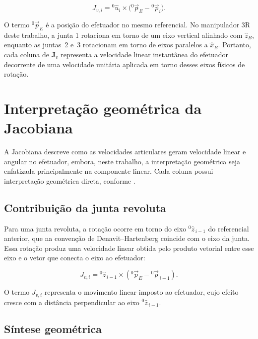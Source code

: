 \begin{equation}
J_{v,i}
=
{}^{0}\!\hat{u}_{i}
\times
\bigl(
{}^{0}\!\vec p_{E}
-
{}^{0}\!\vec p_{i}
\bigr).
\end{equation}

O termo ${}^{0}\!\vec p_{E}$ é a posição do efetuador no mesmo referencial.
No manipulador 3R deste trabalho, a junta 1 rotaciona em torno de um eixo vertical alinhado com $\hat{z}_{B}$, enquanto as juntas~2 e~3 rotacionam em torno de eixos paralelos a $\hat{x}_{B}$. 
Portanto, cada coluna de $\mathbf{J}_{v}$ representa a velocidade linear instantânea do efetuador decorrente de uma velocidade unitária aplicada em torno desses eixos físicos de rotação.

\section{Interpretação geométrica da Jacobiana}
\label{sec_interpretacao_geometrica_jacobiana}

A Jacobiana descreve como as velocidades articulares geram velocidade linear e angular no efetuador, embora, neste trabalho, a interpretação geométrica seja enfatizada principalmente na componente linear.
Cada coluna possui interpretação geométrica direta, conforme \cite{craig2005}.

\subsection{Contribuição da junta revoluta}

Para uma junta revoluta, a rotação ocorre em torno do eixo ${}^{0}\!\hat{z}_{\,i-1}$ do referencial anterior, que na convenção de Denavit--Hartenberg coincide com o eixo da junta.
Essa rotação produz uma velocidade linear obtida pelo produto vetorial entre esse eixo e o vetor que conecta o eixo ao efetuador:

\begin{equation}
J_{v,i}
=
{}^{0}\!\hat{z}_{\,i-1}
\times
\left(
{}^{0}\!\vec{p}_{E}
-
{}^{0}\!\vec{p}_{\,i-1}
\right).
\end{equation}

O termo $J_{v,i}$ representa o movimento linear imposto ao efetuador, cujo efeito cresce com a distância perpendicular ao eixo ${}^{0}\!\hat{z}_{\,i-1}$.

\subsection{Síntese geométrica}

